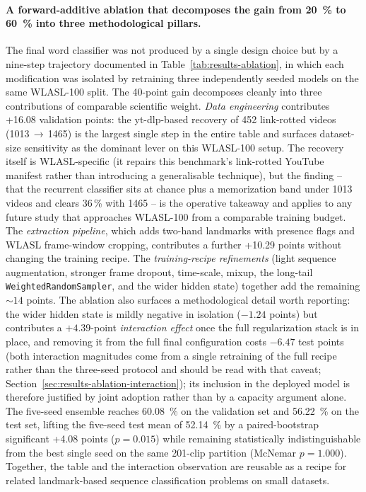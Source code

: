 \paragraph{A forward-additive ablation that decomposes the gain from
\SI{20}{\percent} to \SI{60}{\percent} into three methodological pillars.}
The final word classifier was not produced by a single design choice but
by a nine-step trajectory documented in
Table~\ref{tab:results-ablation}, in which each modification was
isolated by retraining three independently seeded models on the same
WLASL-100 split. The 40-point gain decomposes cleanly into three
contributions of comparable scientific weight. \emph{Data engineering}
contributes +16.08 validation points: the yt-dlp-based recovery of 452
link-rotted videos (\num{1013}\,$\to$\,\num{1465}) is the largest single
step in the entire table and surfaces dataset-size sensitivity as the
dominant lever on this WLASL-100 setup. The recovery itself is
WLASL-specific (it repairs this benchmark's link-rotted YouTube
manifest rather than introducing a generalisable technique), but the
finding -- that the recurrent classifier sits at chance plus a
memorization band under \num{1013} videos and clears 36\,\% with
\num{1465} -- is the operative takeaway and applies to any future
study that approaches WLASL-100 from a comparable training budget. The \emph{extraction pipeline}, which adds
two-hand landmarks with presence flags and WLASL frame-window cropping,
contributes a further +10.29 points without changing the training
recipe. The \emph{training-recipe refinements} (light sequence
augmentation, stronger frame dropout, time-scale, mixup, the long-tail
\texttt{WeightedRandomSampler}, and the wider hidden state) together
add the remaining ${\sim}14$ points. The ablation also surfaces a
methodological detail worth reporting: the wider hidden state is mildly
negative in isolation ($-1.24$ points) but contributes a $+4.39$-point
\emph{interaction effect} once the full regularization stack is in
place, and removing it from the full final configuration costs
$-6.47$ test points (both interaction magnitudes come from a single
retraining of the full recipe rather than the three-seed protocol and
should be read with that caveat;
Section~\ref{sec:results-ablation-interaction}); its
inclusion in the deployed model is therefore justified by joint
adoption rather than by a capacity argument alone. The five-seed ensemble reaches
\SI{60.08}{\percent} on the validation set and \SI{56.22}{\percent} on
the test set, lifting the five-seed test mean of \SI{52.14}{\percent}
by a paired-bootstrap significant +4.08 points ($p = 0.015$) while
remaining statistically indistinguishable from the best single seed on
the same 201-clip partition (McNemar $p = 1.000$). Together, the table
and the interaction observation are reusable as a recipe for related
landmark-based sequence classification problems on small datasets.

